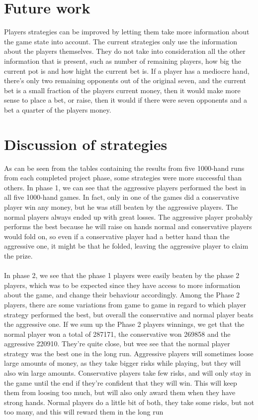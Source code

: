 \documentclass[titlepage]{article}
\begin{document}
\section{Future work}
	Players strategies can be improved by letting them take more information about the game state into account. The current strategies only use the information about the players themselves. They do not take into consideration all the other information that is present, such as number of remaining players, how big the current pot is and how hight the current bet is. If a player has a mediocre hand, there's only two remaining opponents out of the original seven, and the current bet is a small fraction of the players current money, then it would make more sense to place a bet, or raise, then it would if there were seven opponents and a bet a quarter of the players money.
	
\section{Discussion of strategies}
    As can be seen from the tables containing the results from five 1000-hand runs from each completed project phase, some strategies were more successful than others. In phase 1, we can see that the aggressive players performed the best in all five 1000-hand games. In fact, only in one of the games did a conservative player win any money, but he was still beaten by the aggressive players. The normal players always ended up with great losses. The aggressive player probably performs the best because he will raise on hands normal and conservative players would fold on, so even if a conservative player had a better hand than the aggressive one, it might be that he folded, leaving the aggressive player to claim the prize. \\ \\ In phase 2, we see that the phase 1 players were easily beaten by the phase 2 players, which was to be expected since they have access to more information about the game, and change their behaviour accordingly. Among the Phase 2 players, there are some variations from game to game in regard to which player strategy performed the best, but overall the conservative and normal player beats the aggressive one. If we sum up the Phase 2 players winnings, we get that the normal player won a total of 287171, the conservative won 269858 and the aggressive 220910. They're quite close, but wee see that the normal player strategy was the best one in the long run. Aggressive players will sometimes loose large amounts of money, as they take bigger risks while playing, but they will also win large amounts. Conservative players take few risks, and will only stay in the game until the end if they're confident that they will win. This will keep them from loosing too much, but will also only award them when they have strong hands. Normal players do a little bit of both, they take some risks, but not too many, and this will reward them in the long run
\end{document}
